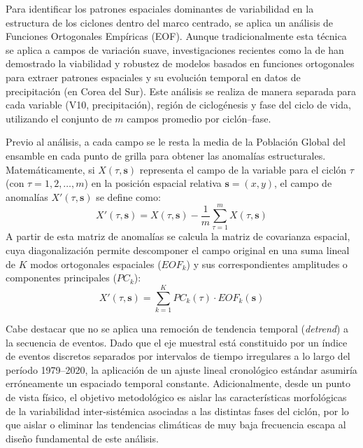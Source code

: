 Para identificar los patrones espaciales dominantes de variabilidad en la estructura de los ciclones dentro del marco centrado, se aplica un análisis de Funciones Ortogonales Empíricas (EOF). 
Aunque tradicionalmente esta técnica se aplica a campos de variación suave, investigaciones recientes como la de \citet{sun2022evaluation} han demostrado la viabilidad y robustez de modelos basados en funciones ortogonales para extraer patrones espaciales y su evolución temporal en datos de precipitación (en Corea del Sur).
Este análisis se realiza de manera separada para cada variable (V10, precipitación), región de ciclogénesis y fase del ciclo de vida, utilizando el conjunto de $m$ campos promedio por ciclón--fase.

Previo al análisis, a cada campo se le resta la media de la Población Global del ensamble en cada punto de grilla para obtener las anomalías estructurales. Matemáticamente, si $X(\tau, \mathbf{s})$ representa el campo de la variable para el ciclón $\tau$ (con $\tau = 1, 2, \dots, m$) en la posición espacial relativa $\mathbf{s} = (x, y)$, el campo de anomalías $X'(\tau, \mathbf{s})$ se define como:
\begin{equation}
    X'(\tau, \mathbf{s}) = X(\tau, \mathbf{s}) - \frac{1}{m}\sum_{\tau=1}^{m}X(\tau, \mathbf{s})
\end{equation}
A partir de esta matriz de anomalías se calcula la matriz de covarianza espacial, cuya diagonalización permite descomponer el campo original en una suma lineal de $K$ modos ortogonales espaciales ($EOF_k$) y sus correspondientes amplitudes o componentes principales ($PC_k$):
\begin{equation}
    X'(\tau, \mathbf{s}) = \sum_{k=1}^{K} PC_k(\tau) \cdot EOF_k(\mathbf{s})
\end{equation}

Cabe destacar que no se aplica una remoción de tendencia temporal (\textit{detrend}) a la secuencia de eventos. Dado que el eje muestral está constituido por un índice de eventos discretos separados por intervalos de tiempo irregulares a lo largo del período 1979--2020, la aplicación de un ajuste lineal cronológico estándar asumiría erróneamente un espaciado temporal constante. Adicionalmente, desde un punto de vista físico, el objetivo metodológico es aislar las características morfológicas de la variabilidad inter-sistémica asociadas a las distintas fases del ciclón, por lo que aislar o eliminar las tendencias climáticas de muy baja frecuencia escapa al diseño fundamental de este análisis.


